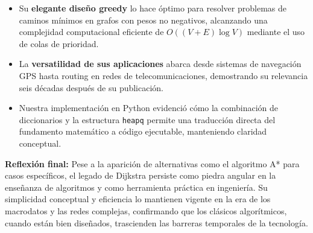 \documentclass{article}
\begin{document}
\begin{itemize}
    \item Su \textbf{elegante diseño greedy} lo hace óptimo para resolver problemas de caminos mínimos en grafos con pesos no negativos, alcanzando una complejidad computacional eficiente de $O((V+E) \log V)$ mediante el uso de colas de prioridad.

    \item La \textbf{versatilidad de sus aplicaciones} abarca desde sistemas de navegación GPS hasta routing en redes de telecomunicaciones, demostrando su relevancia seis décadas después de su publicación.

    \item Nuestra implementación en Python evidenció cómo la combinación de diccionarios y la estructura \texttt{heapq} permite una traducción directa del fundamento matemático a código ejecutable, manteniendo claridad conceptual.
\end{itemize}

\noindent\textbf{Reflexión final:} Pese a la aparición de alternativas como el algoritmo A* para casos específicos, el legado de Dijkstra persiste como piedra angular en la enseñanza de algoritmos y como herramienta práctica en ingeniería. Su simplicidad conceptual y eficiencia lo mantienen vigente en la era de los macrodatos y las redes complejas, confirmando que los clásicos algorítmicos, cuando están bien diseñados, trascienden las barreras temporales de la tecnología.
\end{document}
